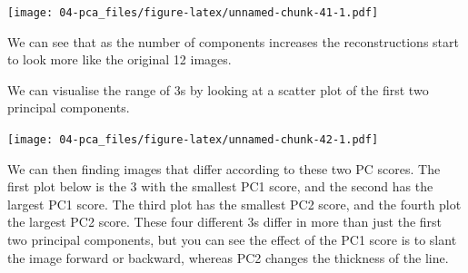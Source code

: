 \documentclass[
]{book}
\newenvironment{Shaded}{\begin{snugshade}}{\end{snugshade}}
\newcommand{\AttributeTok}[1]{\textcolor[rgb]{0.13,0.29,0.53}{#1}}
\newcommand{\CommentTok}[1]{\textcolor[rgb]{0.56,0.35,0.01}{\textit{#1}}}
\newcommand{\DecValTok}[1]{\textcolor[rgb]{0.00,0.00,0.81}{#1}}
\newcommand{\FunctionTok}[1]{\textcolor[rgb]{0.13,0.29,0.53}{\textbf{#1}}}
\newcommand{\NormalTok}[1]{#1}
\newcommand{\OtherTok}[1]{\textcolor[rgb]{0.56,0.35,0.01}{#1}}
\newcommand{\SpecialCharTok}[1]{\textcolor[rgb]{0.81,0.36,0.00}{\textbf{#1}}}
\theoremstyle{definition}
\theoremstyle{definition}
\theoremstyle{definition}
\theoremstyle{definition}
\theoremstyle{remark}
\begin{document}
\texttt{[image: 04-pca\_files/figure-latex/unnamed-chunk-41-1.pdf]}

We can see that as the number of components increases the reconstructions start to look more like the original 12 images.

We can visualise the range of 3s by looking at a scatter plot of the first two principal components.

\begin{Shaded}
\end{Shaded}

\texttt{[image: 04-pca\_files/figure-latex/unnamed-chunk-42-1.pdf]}

We can then finding images that differ according to these two PC scores. The first plot below is the 3 with the smallest PC1 score, and the second has the largest PC1 score. The third plot has the smallest PC2 score, and the fourth plot the largest PC2 score.
These four different 3s differ in more than just the first two principal components, but you can see the effect of the PC1 score is to slant the image forward or backward, whereas PC2 changes the thickness of the line.

\begin{Shaded}
\end{Shaded}
\end{document}
